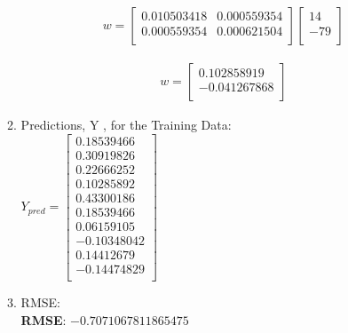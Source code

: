 \documentclass[12pt]{article}
\begin{document}
\begin{enumerate}
\begin{enumerate}
\begin{equation}
	\begin{split}
		w = \begin{bmatrix}
			0.010503418 & 0.000559354\\
			0.000559354 & 0.000621504\\
		\end{bmatrix}\begin{bmatrix}
			14\\
			-79\\
		\end{bmatrix}
	\end{split}
\end{equation}

\begin{equation}
	\begin{split}
		w = \begin{bmatrix}
			0.102858919\\
			-0.041267868\\
		\end{bmatrix}
	\end{split}
\end{equation}



		\begin{comment}
	\newpage
	\end{comment}
	
	\item Predictions, Y , for the Training Data:\\
	
	$
		Y_{pred}=
	\begin{bmatrix}
		0.18539466\\
		0.30919826\\	
		0.22666252\\
		0.10285892\\
		0.43300186\\
		0.18539466\\
		0.06159105\\
		-0.10348042\\
		0.14412679\\
		-0.14474829\\
	\end{bmatrix}
	$


	\item RMSE:\\
	

	
	\textbf{RMSE}: $-0.7071067811865475$

		
	

\end{enumerate}
\end{enumerate}
\end{document}
